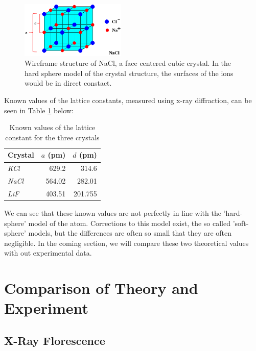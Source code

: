 \documentclass[%
 reprint,
 amsmath,amssymb,
 aps,
 pra,
]{revtex4-1}
\begin{document}
\begin{figure}[H]
	\centering
	\includegraphics[width=5cm]{nacl_lattice.png}
	\caption{Wireframe structure of NaCl, a face centered cubic crystal. In the hard sphere model of the crystal structure, the surfaces of the ions would be in direct constact.}
	\label{fig:lattice_nacl}
\end{figure}

Known values\cite{lattice, lattice2, lattice3} of the lattice constants, measured using x-ray diffraction, can be seen in Table \ref{table:known_d} below:

\begin{table}[htbp]
	\begin{center}
	\begin{tabular}{|l|r|r|}
		\hline
		\textbf{Crystal} & \multicolumn{1}{l|}{\textbf{$a$ (pm)}} & \multicolumn{1}{l|}{\textbf{$d$ (pm)}} \\ \hline
		\textit{KCl} & 629.2 & 314.6 \\ \hline
		\textit{NaCl} & 564.02 & 282.01 \\ \hline
		\textit{LiF} & 403.51 & 201.755 \\ \hline
	\end{tabular}
	\end{center}
	\caption{Known values of the lattice constant for the three crystals}
	\label{table:known_d}
\end{table}

We can see that these known values are not perfectly in line with the 'hard-sphere' model of the atom. Corrections to this model exist, the so called 'soft-sphere' models\cite{soft_sphere}, but the differences are often so small that they are often negligible. In the coming section, we will compare these two theoretical values with out experimental data.


\section{Comparison of Theory and Experiment}

\subsection{X-Ray Florescence}
\end{document}
